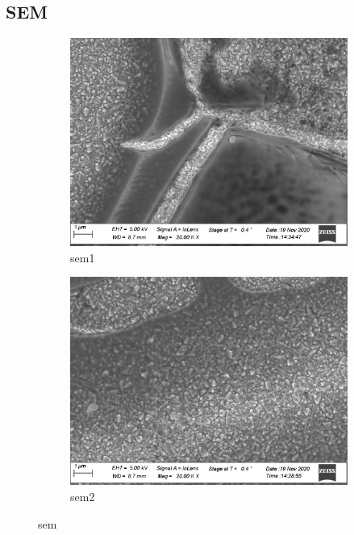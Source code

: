 \subsection{SEM}
\begin{figure}
    \centering
    \begin{subfigure}{.4\textwidth}
        \includegraphics[width=\textwidth]{Pics/sem/071_fto_old_1x.png}
        \caption{sem1}
        \label{fig:sem1}
    \end{subfigure}
    \begin{subfigure}{.4\textwidth}
        \includegraphics[width=\textwidth]{Pics/sem/071_fto_old_2x.png}
        \caption{sem2}
        \label{fig:sem2}
    \end{subfigure}
    \caption{sem}
    \label{fig:sem}
\end{figure}


